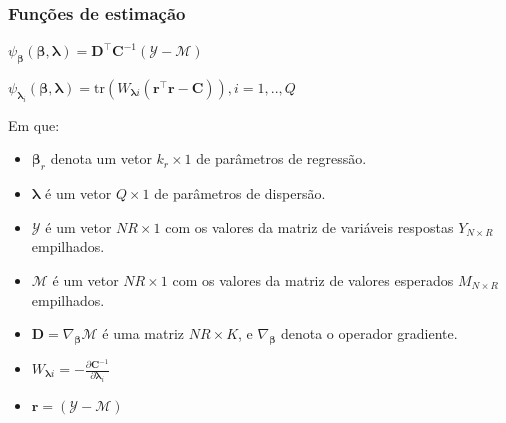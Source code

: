 \documentclass[10pt,
  aspectratio=169,
  serif,
  mathserif,
  professionalfont,
  compress,
  handout,
  ]{beamer}\usepackage[]{graphicx}\usepackage[]{color}
\begin{document}
\begin{frame}

\frametitle{Funções de estimação}

\begin{center}
$\psi_{\boldsymbol{\beta}}(\boldsymbol{\beta}, \boldsymbol{\lambda}) = \boldsymbol{D}^\top \boldsymbol{C}^{-1}(\mathcal{Y} - \mathcal{M})$

$\psi_{\boldsymbol{\lambda}_i}(\boldsymbol{\beta}, \boldsymbol{\lambda}) = \mathrm{tr}(W_{\boldsymbol{\lambda}i} (\boldsymbol{r}^\top\boldsymbol{r} - \boldsymbol{C})),  i = 1,.., Q$
\end{center}

Em que:

\begin{itemize}
  
  \item \normalsize $\boldsymbol{\beta}_r$ denota um vetor $k_r \times 1$ de parâmetros de regressão.
  
  \item \normalsize $\boldsymbol{\lambda}$ é um vetor $Q \times 1$ de parâmetros de dispersão.
  
  \item \normalsize $\mathcal{Y}$ é um vetor $NR \times 1$ com os valores da matriz de variáveis respostas $Y_{N \times R}$ empilhados.
  
  \item \normalsize $\mathcal{M}$ é um vetor $NR \times 1$ com os valores da matriz de valores esperados $M_{N \times R}$ empilhados.
  
  \item \normalsize $\boldsymbol{D} = \nabla_{\boldsymbol{\beta}} \mathcal{M}$ 
é uma matriz $NR \times K$, e $\nabla_{\boldsymbol{\beta}}$ denota o 
operador gradiente.
  
  \item \normalsize $W_{\boldsymbol{\lambda}i} = -\frac{\partial
    \boldsymbol{C}^{-1}}{\partial \boldsymbol{\lambda}_i}$ 
    
  \item \normalsize $\boldsymbol{r} = (\mathcal{Y} - \mathcal{M})$
  
\end{itemize}

\end{frame}

\end{document}

